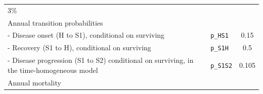 \documentclass[]{article}
\begin{document}
\begin{longtable}[]{@{}llc@{}}
\begin{minipage}[t]{0.20\columnwidth}
3\%\strut
\end{minipage}\tabularnewline
\begin{minipage}[t]{0.47\columnwidth}\raggedright\strut
Annual transition probabilities\strut
\end{minipage} & \begin{minipage}[t]{0.18\columnwidth}\raggedright\strut
\strut
\end{minipage} & \begin{minipage}[t]{0.20\columnwidth}\centering\strut
\strut
\end{minipage}\tabularnewline
\begin{minipage}[t]{0.47\columnwidth}\raggedright\strut
- Disease onset (H to S1), conditional on surviving\strut
\end{minipage} & \begin{minipage}[t]{0.18\columnwidth}\raggedright\strut
\texttt{p\_HS1}\strut
\end{minipage} & \begin{minipage}[t]{0.20\columnwidth}\centering\strut
0.15\strut
\end{minipage}\tabularnewline
\begin{minipage}[t]{0.47\columnwidth}\raggedright\strut
- Recovery (S1 to H), conditional on surviving\strut
\end{minipage} & \begin{minipage}[t]{0.18\columnwidth}\raggedright\strut
\texttt{p\_S1H}\strut
\end{minipage} & \begin{minipage}[t]{0.20\columnwidth}\centering\strut
0.5\strut
\end{minipage}\tabularnewline
\begin{minipage}[t]{0.47\columnwidth}\raggedright\strut
- Disease progression (S1 to S2) conditional on surviving, in the
time-homogeneous model\strut
\end{minipage} & \begin{minipage}[t]{0.18\columnwidth}\raggedright\strut
\texttt{p\_S1S2}\strut
\end{minipage} & \begin{minipage}[t]{0.20\columnwidth}\centering\strut
0.105\strut
\end{minipage}\tabularnewline
\begin{minipage}[t]{0.47\columnwidth}\raggedright\strut
Annual mortality\strut
\end{minipage} & \begin{minipage}[t]{0.18\columnwidth}\raggedright\strut
\strut
\end{minipage} & \begin{minipage}[t]{0.20\columnwidth}\centering\strut

\end{minipage}
\end{longtable}
\end{document}
